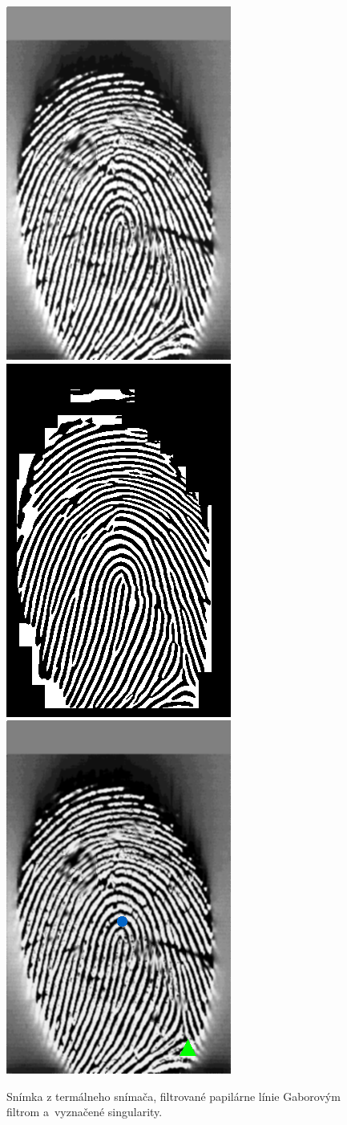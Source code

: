  \begin{figure}[h]\centering
    \centering
    \includegraphics[width=0.25\linewidth]{obrazky-figures/eval_results/termal_orig.png}\hspace{0.02\linewidth}
    \includegraphics[width=0.25\linewidth]{obrazky-figures/eval_results/termal_gabor.png}\hspace{0.02\linewidth}
    \includegraphics[width=0.25\linewidth]{obrazky-figures/eval_results/termal_singularities.png}
    \caption{Snímka z termálneho snímača, filtrované papilárne línie Gaborovým filtrom a~vyznačené singularity.}
    \label{obr:vyhodnotenie_termal_mini}
  \end{figure}


